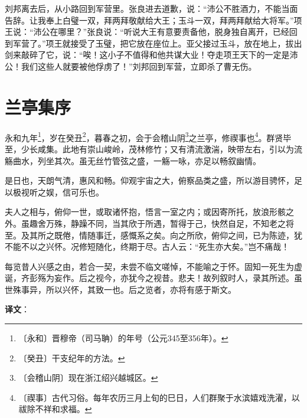 \documentclass[12pt,UTF-8,openany,a4]{ctexbook}
\begin{document}
\begin{large}
    刘邦离去后，从小路回到军营里。张良进去道歉，说：“沛公不胜酒力，不能当面告辞。让我奉上白璧一双，拜两拜敬献给大王；玉斗一双，拜两拜献给大将军。”项王说：“沛公在哪里？”张良说：“听说大王有意要责备他，脱身独自离开，已经回到军营了。”项王就接受了玉璧，把它放在座位上。亚父接过玉斗，放在地上，拔出剑来敲碎了它，说：“唉！这小子不值得和他共谋大业！夺走项王天下的一定是沛公！我们这些人就要被他俘虏了！”刘邦回到军营，立即杀了曹无伤。
    

\end{large}



\chapter{兰亭集序}

\begin{large}
    
    永和九年\footnote{〔永和〕\yiwen 晋穆帝（司马聃）的年号（公元345至356年）。}，岁在癸丑\footnote{〔癸丑〕\yiwen 干支纪年的方法。}，暮春之初，会于会稽山阴\footnote{〔会稽山阴〕\yiwen 现在浙江绍兴越城区。}之兰亭，修禊事也\footnote{〔禊事〕\yiwen 古代习俗。每年农历三月上旬的巳日，人们群聚于水滨嬉戏洗濯，以祓除不祥和求福。}。群贤毕至，少长咸集。此地有崇山峻岭，茂林修竹；又有清流激湍，映带左右，引以为流觞曲水，列坐其次。虽无丝竹管弦之盛，一觞一咏，亦足以畅叙幽情。
    
    是日也，天朗气清，惠风和畅。仰观宇宙之大，俯察品类之盛，所以游目骋怀，足以极视听之娱，信可乐也。
    
    夫人之相与，俯仰一世，或取诸怀抱，悟言一室之内；或因寄所托，放浪形骸之外。虽趣舍万殊，静躁不同，当其欣于所遇，暂得于己，快然自足，不知老之将至。及其所之既倦，情随事迁，感慨系之矣。向之所欣，俯仰之间，已为陈迹，犹不能不以之兴怀。况修短随化，终期于尽。古人云：“死生亦大矣。”岂不痛哉！
    
    每览昔人兴感之由，若合一契，未尝不临文嗟悼，不能喻之于怀。固知一死生为虚诞，齐彭殇为妄作。后之视今，亦犹今之视昔。悲夫！故列叙时人，录其所述。虽世殊事异，所以兴怀，其致一也。后之览者，亦将有感于斯文。

\end{large}


\newpage

\begin{Large}
   \noindent \textbf{译文}：
\end{Large}

\vspace{1em}
\end{document}

